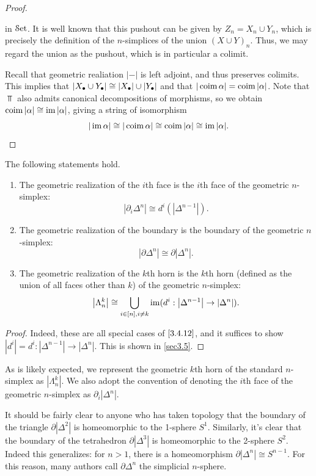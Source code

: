\begin{proof}
\begin{enumerate}
    in $\mathcal{S}\mathrm{et}$. It is well known that this pushout can be given by $Z_n=X_n\cup Y_n$, which is precisely the definition of the $n$-simplices of the union $(X\cup Y)_n$. Thus, we may regard the union as the pushout, which is in particular a colimit.
    \end{enumerate}
    Recall that geometric realiation $|-|$ is left adjoint, and thus preserves colimits. This implies that $|X_\bullet\cup Y_\bullet|\cong|X_\bullet|\cup|Y_\bullet|$ and that $|\operatorname{coim}\alpha|=\operatorname{coim}|\alpha|$. Note that $\Top$ also admits canonical decompositions of morphisms, so we obtain $\operatorname{coim}|\alpha|\cong\operatorname{im}|\alpha|$, giving a string of isomorphism
    \[
    |\operatorname{im}\alpha|\cong|\operatorname{coim}\alpha|\cong\operatorname{coim}|\alpha|\cong\operatorname{im}|\alpha|.
    \]
\end{proof}

\begin{corollary}\label{3.4.13}
    The following statements hold.
\begin{enumerate}
    \item The geometric realization of the $i$th face is the $i$th face of the geometric $n$-simplex:
    \[
    \left|\partial_i\Delta^n\right|\cong d^i(|\Delta^{n-1}|).
    \]
    \item The geometric realization of the boundary is the boundary of the geometric $n$-simplex:
    \[
    \left|\partial\Delta^n\right|\cong\partial\left|\Delta^n\right|.
    \]
    \item The geometric realization of the $k$th horn is the $k$th horn (defined as the union of all faces other than $k$) of the geometric $n$-simplex:
    \[
    \left|\Lambda_n^k\right|\cong\bigcup_{i\in[n],i\neq k}\operatorname{im} (d^i :\left|\Delta^{n-1}\right|\to\left|\Delta^n\right|).
    \]
\end{enumerate}
\end{corollary}
\begin{proof}
	Indeed, these are all special cases of $\cref{3.4.12}$, and it suffices to show $|d^i|=d^i : |\Delta^{n-1}|\to|\Delta^n|$. This is shown in \cref{sec3.5}.
\end{proof}

\begin{notation}\label{3.4.14}
    As is likely expected, we represent the geometric $k$th horn of the standard $n$-simplex as $|\Lambda_n^k|$. We also adopt the convention of denoting the $i$th face of the geometric $n$-simplex as $\partial_i|\Delta^n|$.
\end{notation}

\begin{remark}\label{3.4.15}
    It should be fairly clear to anyone who has taken topology that the boundary of the triangle $\partial|\Delta^2|$ is homeomorphic to the 1-sphere $S^1$. Similarly, it's clear that the boundary of the tetrahedron $\partial|\Delta^3|$ is homeomorphic to the 2-sphere $S^2$. Indeed this generalizes: for $n>1$, there is a homeomorphism $\partial|\Delta^n|\cong S^{n-1}$. For this reason, many authors call $\partial\Delta^n$ the simplicial $n$-sphere.
\end{remark}

